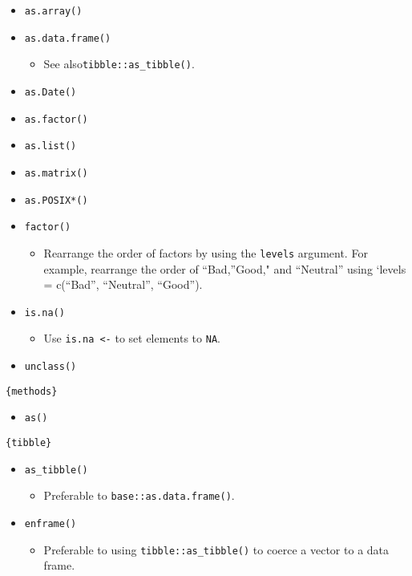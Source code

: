 \documentclass[
]{book}
\providecommand{\tightlist}{%
  \setlength{\itemsep}{0pt}\setlength{\parskip}{0pt}}
\begin{document}
\begin{itemize}
\tightlist
\item
  \texttt{as.array()}
\item
  \texttt{as.data.frame()}

  \begin{itemize}
  \tightlist
  \item
    See also\texttt{tibble::as\_tibble()}.
  \end{itemize}
\item
  \texttt{as.Date()}
\item
  \texttt{as.factor()}
\item
  \texttt{as.list()}
\item
  \texttt{as.matrix()}
\item
  \texttt{as.POSIX*()}
\item
  \texttt{factor()}

  \begin{itemize}
  \tightlist
  \item
    Rearrange the order of factors by using the \texttt{levels} argument. For example, rearrange the order of ``Bad,''Good," and ``Neutral'' using `levels = c(``Bad'', ``Neutral'', ``Good'').
  \end{itemize}
\item
  \texttt{is.na()}

  \begin{itemize}
  \tightlist
  \item
    Use \texttt{is.na\ \textless{}-} to set elements to \texttt{NA}.
  \end{itemize}
\item
  \texttt{unclass()}
\end{itemize}

\texttt{\{methods\}}

\begin{itemize}
\tightlist
\item
  \texttt{as()}
\end{itemize}

\texttt{\{tibble\}}

\begin{itemize}
\tightlist
\item
  \texttt{as\_tibble()}

  \begin{itemize}
  \tightlist
  \item
    Preferable to \texttt{base::as.data.frame()}.
  \end{itemize}
\item
  \texttt{enframe()}

  \begin{itemize}
  \tightlist
  \item
    Preferable to using \texttt{tibble::as\_tibble()} to coerce a vector to a data frame.
  \end{itemize}
\end{itemize}
\end{document}
